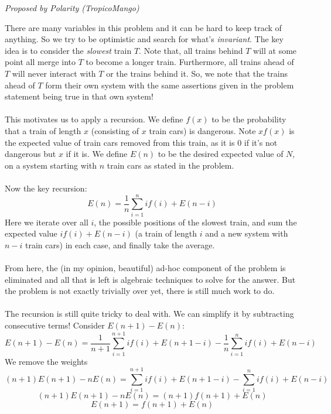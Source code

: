 \begin{enumerate}[align=left,start=1,label=\textbf{\textcolor{meablue}{Problem \arabic*}}]
    \textrm{\emph{Proposed by Polarity (TropicoMango)}}

    \begin{solution}
        There are many variables in this problem and it can be hard to keep track of anything. So we try to be optimistic and search for what's \emph{invariant}. The key idea is to consider the \emph{slowest} train $T$. Note that, all trains behind $T$ will at some point all merge into $T$ to become a longer train. Furthermore, all trains ahead of $T$ will never interact with $T$ or the trains behind it. So, we note that the trains ahead of $T$ form their own system with the same assertions given in the problem statement being true in that own system! 
        \\ \\ 
        This motivates us to apply a recursion. We define $f(x)$ to be the probability that a train of length $x$ (consisting of $x$ train cars) is dangerous. Note $xf(x)$ is the expected value of train cars removed from this train, as it is 0 if it's not dangerous but $x$ if it is. We define $E(n)$ to be the desired expected value of $N$, on a system starting with $n$ train cars as stated in the problem. 
        \\ \\ 
        Now the key recursion:
        \[E(n) = \frac{1}{n}\sum_{i = 1}^{n} i f(i) + E(n - i)\]
        Here we iterate over all $i$, the possible positions of the slowest train, and sum the expected value $i f(i) + E(n - i)$ (a train of length $i$ and a new system with $n - i$ train cars) in each case, and finally take the average. 
        \\ \\ 
        From here, the (in my opinion, beautiful) ad-hoc component of the problem is eliminated and all that is left is algebraic techniques to solve for the answer. But the problem is not exactly trivially over yet, there is still much work to do. 
        \\ \\ 
        The recursion is still quite tricky to deal with. We can simplify it by subtracting consecutive terms! Consider $E(n + 1) - E(n)$:
        \[E(n + 1) - E(n) = \frac{1}{n + 1}\sum_{i = 1}^{n + 1} i f(i) + E(n + 1 - i) - \frac{1}{n}\sum_{i = 1}^{n} i f(i) + E(n - i)\]
        We remove the weights 
        \[(n + 1)E(n + 1) - nE(n) = \sum_{i = 1}^{n + 1} i f(i) + E(n + 1 - i) - \sum_{i = 1}^{n} i f(i) + E(n - i)\]
        \[(n + 1)E(n + 1) - nE(n) = (n + 1)f(n + 1) + E(n)\]
        \[E(n + 1) = f(n + 1) + E(n)\]

\end{solution}
\end{enumerate}
